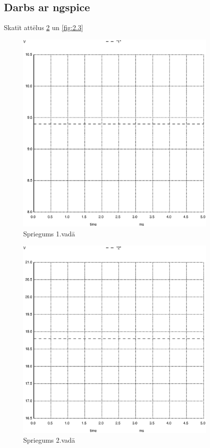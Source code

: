 \documentclass{report}
\begin{document}
\subsection{Darbs ar ngspice}
Skatīt attēlus \ref{fig:2.2} un \ref{fig:2.3} 
\begin{figure}[!h]
    \centering
    \includegraphics[width=10cm]{011.ps}
    \caption{Spriegums 1.vadā}
    \label{fig:2.1}
    \end{figure}
 \begin{figure}[t]
 \centering
    \includegraphics[width=10cm]{012.ps}
    \caption{Spriegums 2.vadā}
    \label{fig:2.2}
\end{figure}
\newpage
\end{document}
